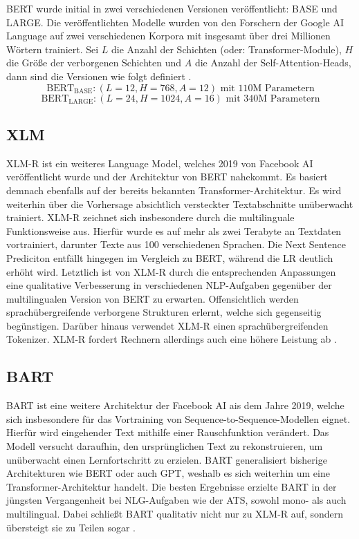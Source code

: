 \noindent
\ac{BERT} wurde initial in zwei verschiedenen Versionen veröffentlicht: BASE und LARGE. Die veröffentlichten Modelle wurden von den Forschern der Google AI Language auf zwei verschiedenen Korpora mit insgesamt über drei Millionen Wörtern trainiert. Sei $L$ die Anzahl der Schichten (oder: Transformer-Module), $H$ die Größe der verborgenen Schichten und $A$ die Anzahl der Self-Attention-Heads, dann sind die Versionen wie folgt definiert \cite[S.~3-5]{DEV19}. $$\text{BERT}_{\text{BASE}}: (L=12, H=768, A=12) \text{ mit } 110 \text{M Parametern}$$ $$\text{BERT}_{\text{LARGE}}: (L=24, H=1024, A=16) \text{ mit } 340 \text{M Parametern}$$


\subsection{XLM}
\noindent
\ac{XLM-R} ist ein weiteres Language Model, welches 2019 von Facebook AI veröffentlicht wurde und der Architektur von \ac{BERT} nahekommt. Es basiert demnach ebenfalls auf der bereits bekannten Transformer-Architektur. Es wird weiterhin über die Vorhersage absichtlich versteckter Textabschnitte unüberwacht trainiert. \ac{XLM-R} zeichnet sich insbesondere durch die multilinguale Funktionsweise aus. Hierfür wurde es auf mehr als zwei Terabyte an Textdaten vortrainiert, darunter Texte aus 100 verschiedenen Sprachen. Die Next Sentence Prediciton entfällt hingegen im Vergleich zu \ac{BERT}, während die \ac{LR} deutlich erhöht wird. Letztlich ist von \ac{XLM-R} durch die entsprechenden Anpassungen eine qualitative Verbesserung in verschiedenen \ac{NLP}-Aufgaben gegenüber der multilingualen Version von \ac{BERT} zu erwarten. Offensichtlich werden sprachübergreifende verborgene Strukturen erlernt, welche sich gegenseitig begünstigen. Darüber hinaus verwendet \ac{XLM-R} einen sprachübergreifenden Tokenizer. \ac{XLM-R} fordert Rechnern allerdings auch eine höhere Leistung ab \cite{CON20}.


\subsection{BART}
\noindent
\ac{BART} ist eine weitere Architektur der Facebook AI ais dem Jahre 2019, welche sich insbesondere für das Vortraining von Sequence-to-Sequence-Modellen eignet. Hierfür wird eingehender Text mithilfe einer Rauschfunktion verändert. Das Modell versucht daraufhin, den ursprünglichen Text zu rekonstruieren, um unüberwacht einen Lernfortschritt zu erzielen. \ac{BART} generalisiert bisherige Architekturen wie \ac{BERT} oder auch \ac{GPT}, weshalb es sich weiterhin um eine Transformer-Architektur handelt. Die besten Ergebnisse erzielte \ac{BART} in der jüngsten Vergangenheit bei \ac{NLG}-Aufgaben wie der \ac{ATS}, sowohl mono- als auch multilingual. Dabei schließt \ac{BART} qualitativ nicht nur zu \ac{XLM-R} auf, sondern übersteigt sie zu Teilen sogar \cite{LEW19}.



